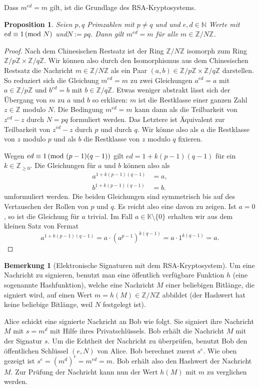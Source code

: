 \documentclass[
a4paper,12pt,
bibliography=totocnumbered,
numbers=noenddot,
]{scrartcl}
\numberwithin{equation}{subsection}
\newcommand{\N}{\mathbb N}
\newcommand{\Z}{\mathbb Z}
\newcommand{\K}{\mathbb K}
\theoremstyle{plain}
\newtheorem*{propn}{Proposition}
\theoremstyle{definition}
\newtheorem*{bem}{Bemerkung}
\begin{document}
	Dass $m^{ed} = m$ gilt, ist die Grundlage des RSA-Kryptosystems. 
	
	\begin{propn}
		Seien $p,q$ Primzahlen mit $p \ne q$ und und $e ,d \in \N$ Werte mit $ed \equiv 1 \,(\mathrm{mod} \ N)$ und$N:=pq$. Dann gilt $m^{ed} = m$ für alle $m \in \Z / N \Z$. 
	\end{propn} 
	\begin{proof} 
	 Nach dem Chinesischen Restsatz ist der Ring $\Z / N \Z$ isomorph zum Ring $\Z / p \Z \times \Z / q \Z$. Wir können also durch den Isomorphismus aus dem Chinesischen Restsatz die Nachricht $m \in \Z / N \Z$ als ein Paar $(a,b) \in \Z / p \Z \times \Z / q\Z$ darstellen. So reduziert sich die Gleichung $m^{ed} = m$ zu zwei Gleichungen $a^{ed} = a$ mit $a \in \Z/ p \Z$ und $b^{ed} = b$ mit $b \in \Z / q \Z$.  Etwas weniger abstrakt lässt sich der Übergang von $m$ zu $a$ und $b$ so erklären: $m $ ist die Restklasse einer ganzen Zahl $z \in \Z$ modulo $N$. Die Bedingung $m^{ed} =m$ kann dann als die Teilbarkeit von $z^{ed} - z$ durch $N = pq$ formuliert werden. Das Letztere ist Äquivalent zur Teilbarkeit von $z^{ed} - z$ durch $p$ und durch $q$. Wir könne also als $a$ die Restklasse von $z$ modulo $p$ und als $b$ die Restklasse von $z$ modulo $q$ fixieren.
	
	Wegen $ed \equiv 1 \,(\mathrm{mod} \ (p-1)(q-1))$ gilt $ed = 1 + k (p-1)(q-1)$ für ein $k \in \Z_{\ge 0}$. Die Gleichungen für $a$ und $b$ können also als 
	\begin{align*}
			a^{1 + k (p-1) (q-1) } & = a, 
		\\ b^{1 + k (p-1) (q-1) } & =b. 
	\end{align*}
	umformuliert werden.  Die beiden Gleichungen sind symmetrisch bis auf des Vertauschen der Rollen von $p$ und $q$. Es reicht also eine davon zu zeigen. Ist $a=0$, so ist die Gleichung für $a$ trivial. Im Fall $a \in \K \setminus \{0\}$ erhalten wir aus dem kleinen Satz von Fermat
	\[
		a^{1 + k (p-1) (q-1)}  = a \cdot (a^{p-1})^{k (q-1)} = a \cdot 1^{k(q-1)} = a.
	\]
	\end{proof} 

\begin{bem}[Elektronische Signaturen mit dem RSA-Kryptosystem] 
	Um eine Nachricht zu signieren, benutzt man eine öffentlich verfügbare Funktion $h$ (eine sogenannte Hashfunktion), welche eine  Nachricht $M$ einer beliebigen Bitlänge, die signiert wird, auf einen Wert $m = h(M) \in \Z / N \Z$ abbildet (der Hashwert hat keine beliebige Bitlänge, weil $N$ festgelegt ist). 
	
	Alice schickt eine signierte Nachricht an Bob wie folgt. Sie signiert ihre Nachricht $M$ mit $s=m^d$ mit Hilfe ihres Privatschlüssels. Bob erhält die Nachricht $M$ mit der Signatur $s$. Um die Echtheit der Nachricht zu überprüfen, benutzt Bob den öffentlichen Schlüssel $(e,N)$ von Alice. Bob berechnet zuerst $s^e$. Wie oben gezeigt ist $s^e = (m^d)^e = m^{ed} = m$. Bob erhält also den Hashwert der Nachricht $M$. Zur Prüfung der Nachricht kann nun der Wert $h(M)$ mit $m$ zu verglichen werden. 
\end{bem} 
\end{document}
